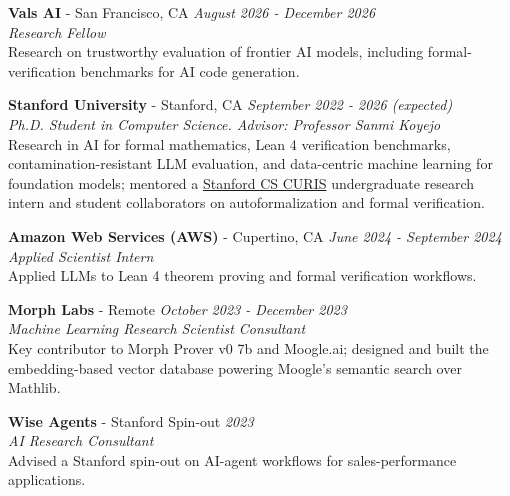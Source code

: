 \documentclass{article}
\newenvironment{changemargin}[2]{%
  \begin{list}{}{%
    \setlength{\topsep}{0pt}%
    \setlength{\leftmargin}{#1}%
    \setlength{\rightmargin}{#2}%
    \setlength{\listparindent}{\parindent}%
    \setlength{\itemindent}{\parindent}%
    \setlength{\parsep}{\parskip}%
  }%
  \item[]}{\end{list}
}
\newenvironment{body} {
		\vspace*{-16pt}
		\begin{changemargin}{-0.25in}{-0.5in}
	  }
		{\end{changemargin}\vspace{8pt plus 12pt}
	}
\begin{document}
\begin{body}
	\vspace{12pt}

	\textbf{Vals AI} - San Francisco, CA \hfill \emph{August 2026 - December 2026}\\
	\emph{Research Fellow}\\
	Research on trustworthy evaluation of frontier AI models, including formal-verification benchmarks for AI code generation.\\
	\vspace{8pt}

 	\textbf{Stanford University} - Stanford, CA \hfill \emph{September 2022 - 2026 (expected)}\\
	\emph{Ph.D. Student in Computer Science. Advisor: Professor Sanmi Koyejo}\\
	Research in AI for formal mathematics, Lean 4 verification benchmarks, contamination-resistant LLM evaluation, and data-centric machine learning for foundation models; mentored a \href{https://www.cs.stanford.edu/bachelors/research-opportunities}{Stanford CS CURIS} undergraduate research intern and student collaborators on autoformalization and formal verification.\\
	\vspace{8pt}

	\textbf{Amazon Web Services (AWS)} - Cupertino, CA \hfill \emph{June 2024 - September 2024}\\
	\emph{Applied Scientist Intern}\\
	Applied LLMs to Lean 4 theorem proving and formal verification workflows.\\
	\vspace{8pt}

	\textbf{Morph Labs} - Remote \hfill \emph{October 2023 - December 2023}\\
	\emph{Machine Learning Research Scientist Consultant}\\
	Key contributor to Morph Prover v0 7b and Moogle.ai; designed and built the embedding-based vector database powering Moogle's semantic search over Mathlib.\\
	\vspace{8pt}

	\textbf{Wise Agents} - Stanford Spin-out \hfill \emph{2023}\\
	\emph{AI Research Consultant}\\
	Advised a Stanford spin-out on AI-agent workflows for sales-performance applications.\\
	\vspace{8pt}


\end{body}
\end{document}
